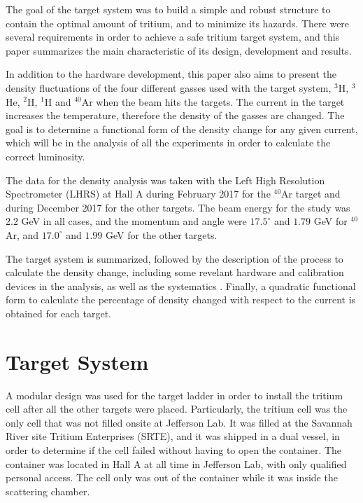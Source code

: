 \documentclass[final,5p,times,twocolumn,balance]{elsarticle}
\begin{document}
The goal of the target system was to build a simple and robust structure to contain the optimal amount of tritium, and to minimize 
its hazards. There were several requirements in order to achieve a safe tritium target system, and this paper summarizes the main characteristic 
of its design, development and results. 

In addition to the hardware development, this paper also aims to present the density fluctuations of the four different gasses used 
with the target system, $^{3}$H, $^{3}$He, $^{2}$H, $^{1}$H and $^{40}$Ar when the beam hits the targets. The current in the target 
increases the temperature, therefore the density of the gasses are changed. The goal is to determine a functional form of the density 
change for any given current, which will be in the analysis of all the experiments in order to calculate the correct luminosity.

The data for the density analysis was taken with the Left High Resolution Spectrometer (LHRS) at Hall A during February 2017 
for the $^{40}$Ar target and during December 2017 for the other targets. The beam energy for the study was $2.2$ GeV in all 
cases, and the momentum and angle were $17.5 ^\circ $ and $1.79$ GeV for $^{40}$Ar, and $17.0 ^\circ $ and $1.99$ GeV for 
the other targets.

The target system is summarized, followed by the description of the process to calculate the density change, including 
some revelant hardware and calibration devices in the analysis, as well as the systematics . Finally, a quadratic functional form 
to calculate the percentage of density changed with respect to the current is  obtained for each target.


\section{Target System}

A modular design was used for the target ladder in order to install the tritium cell after all the other targets were placed. 
Particularly, the tritium cell was the only cell that was not filled onsite at Jefferson Lab. It was filled at the Savannah River 
site Tritium Enterprises (SRTE), and it was shipped in a dual vessel, in order  to determine if the cell failed without having to
open the container. The container was located in Hall A at all time in Jefferson Lab, with only qualified personal access. The cell only was out of the container while it was inside the scattering chamber. 
\end{document}
